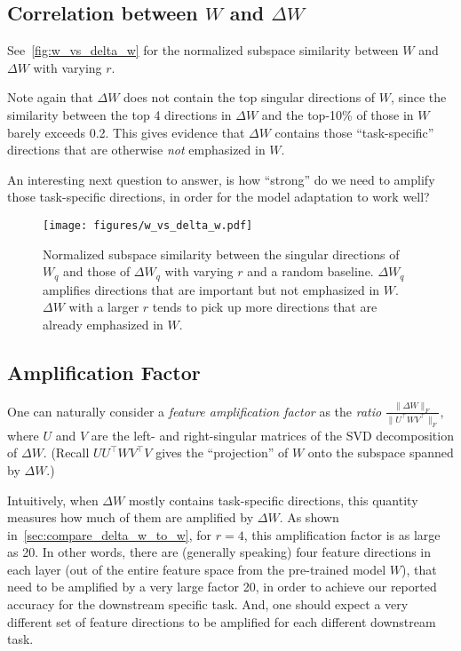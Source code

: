 \subsection{Correlation between $W$ and $\Delta W$}
\label{app:corr_w_delta_w}

See~\autoref{fig:w_vs_delta_w} for the normalized subspace similarity between $W$ and $\Delta W$ with varying $r$.

Note again that $\Delta W$ does not contain the top singular directions of $W$, since the similarity between the top 4 directions in $\Delta W$ and the top-10\% of those in $W$ barely exceeds 0.2. This gives evidence that $\Delta W$ contains those ``task-specific'' directions that are otherwise \emph{not} emphasized in $W$.

An interesting next question to answer, is how ``strong'' do we need to amplify those task-specific directions, in order for the model adaptation to work well?

\begin{figure}[h]
  \centering
    \texttt{[image: figures/w\_vs\_delta\_w.pdf]}
    \caption{Normalized subspace similarity between the singular directions of $W_q$ and those of $\Delta W_q$ with varying $r$ and a random baseline. $\Delta W_q$ amplifies directions that are important but not emphasized in $W$. $\Delta W$ with a larger $r$ tends to pick up more directions that are already emphasized in $W$.}
    \label{fig:w_vs_delta_w}
\end{figure}

\subsection{Amplification Factor}
\label{app:amplification_factor}

One can naturally consider a \emph{feature amplification factor} as the \emph{ratio} $\frac{\|\Delta W\|_F}{\|U^\top WV^\top\|_F}$, where $U$ and $V$ are the left- and right-singular matrices of the SVD decomposition of $\Delta W$. (Recall $UU^\top WV^\top V$ gives the ``projection'' of $W$ onto the subspace spanned by $\Delta W$.)

Intuitively, when $\Delta W$ mostly contains task-specific directions, this quantity measures how much of them are amplified by $\Delta W$.
As shown in~\autoref{sec:compare_delta_w_to_w}, for $r=4$, this amplification factor is as large as 20. In other words, there are (generally speaking) four feature directions in each layer (out of the entire feature space from the pre-trained model $W$), that need to be amplified by a very large factor 20, in order to achieve our reported accuracy for the downstream specific task. And, one should expect a very different set of feature directions  to be amplified for each different downstream task.

